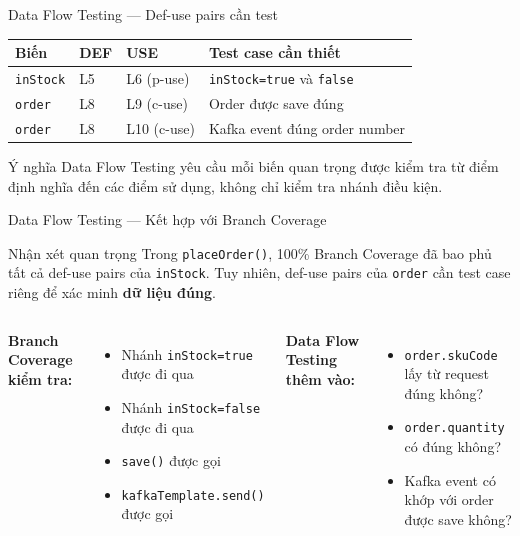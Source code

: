 \documentclass[aspectratio=169,10pt]{beamer}
\begin{document}
\begin{frame}{Data Flow Testing --- Def-use pairs cần test}
  \begin{center}
  \small
  \begin{tabular}{llll}
    \toprule
    \textbf{Biến} & \textbf{DEF} & \textbf{USE} & \textbf{Test case cần thiết} \\
    \midrule
    \texttt{inStock} & L5 & L6 (p-use) & \texttt{inStock=true} và \texttt{false} \\
    \texttt{order} & L8 & L9 (c-use) & Order được save đúng \\
    \texttt{order} & L8 & L10 (c-use) & Kafka event đúng order number \\
    \bottomrule
  \end{tabular}
  \end{center}

  \begin{block}{Ý nghĩa}
    Data Flow Testing yêu cầu mỗi biến quan trọng được kiểm tra từ điểm
    định nghĩa đến các điểm sử dụng, không chỉ kiểm tra nhánh điều kiện.
  \end{block}
\end{frame}

\begin{frame}{Data Flow Testing --- Kết hợp với Branch Coverage}
  \begin{block}{Nhận xét quan trọng}
    Trong \texttt{placeOrder()}, 100\% Branch Coverage đã bao phủ
    tất cả def-use pairs của \texttt{inStock}. Tuy nhiên, def-use pairs
    của \texttt{order} cần test case riêng để xác minh \textbf{dữ liệu đúng}.
  \end{block}

  \begin{columns}
    \textbf{Branch Coverage kiểm tra:}
    \begin{itemize}
      \item Nhánh \texttt{inStock=true} được đi qua
      \item Nhánh \texttt{inStock=false} được đi qua
      \item \texttt{save()} được gọi
      \item \texttt{kafkaTemplate.send()} được gọi
    \end{itemize}

    \textbf{Data Flow Testing thêm vào:}
    \begin{itemize}
      \item \texttt{order.skuCode} lấy từ request đúng không?
      \item \texttt{order.quantity} có đúng không?
      \item Kafka event có khớp với order được save không?
    \end{itemize}
  \end{columns}
\end{frame}
\end{document}
